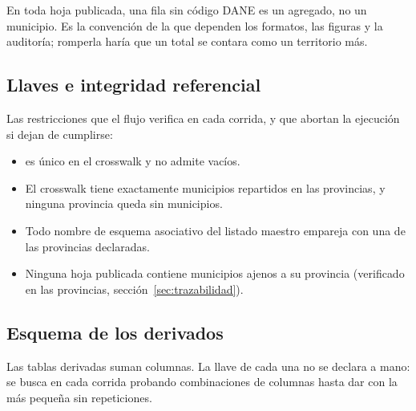 \documentclass[11pt,a4paper]{article}
\begin{document}
\begin{regla}[title={Regla 8 — la fila agregada se reconoce por el código vacío}]
En toda hoja publicada, una fila sin código DANE es un agregado, no un
municipio. Es la convención de la que dependen los formatos, las figuras y la
auditoría; romperla haría que un total se contara como un territorio más.
\end{regla}

\subsection{Llaves e integridad referencial}

\begin{table}[htbp]\centering
\caption{Llaves del modelo, su dominio y su fuente de verdad}
\small

\end{table}

Las restricciones que el flujo verifica en cada corrida, y que abortan la
ejecución si dejan de cumplirse:

\begin{itemize}[leftmargin=*, itemsep=2pt]
  \item {} es único en el crosswalk y no admite vacíos.
  \item El crosswalk tiene exactamente \cifraMunicipios{} municipios repartidos
    en las \cifraProvincias{} provincias, y ninguna provincia queda sin
    municipios.
  \item Todo nombre de esquema asociativo del listado maestro empareja con una
    de las \cifraProvincias{} provincias declaradas.
  \item Ninguna hoja publicada contiene municipios ajenos a su provincia
    (verificado en las \cifraProvincias{} provincias, sección~\ref{sec:trazabilidad}).
\end{itemize}

\subsection{Esquema de los derivados}

Las \cifraTablasDerivadas{} tablas derivadas suman \cifraColumnasDerivadas{}
columnas. La llave de cada una no se declara a mano: se busca en cada corrida
probando combinaciones de columnas hasta dar con la más pequeña sin
repeticiones.

\begin{table}[htbp]\centering
\caption{Estructura de las tablas derivadas}
\scriptsize

\end{table}
\end{document}
